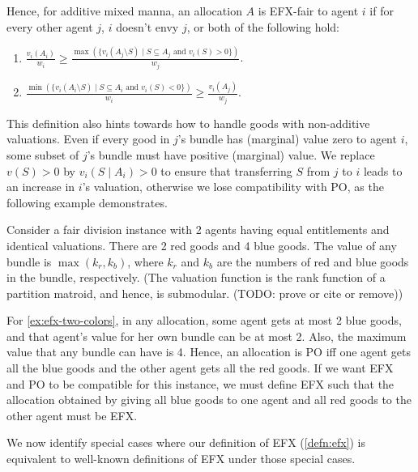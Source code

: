 Hence, for additive mixed manna, an allocation $A$ is EFX-fair to agent $i$
if for every other agent $j$, $i$ doesn't envy $j$, or both of the following hold:
\begin{enumerate}
\item $\displaystyle \frac{v_i(A_i)}{w_i} \ge \frac{\max(\{v_i(A_j \setminus S) \mid S \subseteq A_j
    \textrm{ and } v_i(S) > 0\})}{w_j}$.
\item $\displaystyle \frac{\min(\{v_i(A_i \setminus S) \mid S \subseteq A_i
    \textrm{ and } v_i(S) < 0 \})}{w_i} \ge \frac{v_i(A_j)}{w_j}$.
\end{enumerate}

This definition also hints towards how to handle goods with non-additive valuations.
Even if every good in $j$'s bundle has (marginal) value zero to agent $i$,
some subset of $j$'s bundle must have positive (marginal) value.
We replace $v(S) > 0$ by $v_i(S \mid A_i) > 0$ to ensure that
transferring $S$ from $j$ to $i$ leads to an increase in $i$'s valuation,
otherwise we lose compatibility with PO, as the following example demonstrates.

\begin{example}
\label{ex:efx-two-colors}
Consider a fair division instance with 2 agents having equal entitlements and identical valuations.
There are 2 red goods and 4 blue goods. The value of any bundle is $\max(k_r, k_b)$,
where $k_r$ and $k_b$ are the numbers of red and blue goods in the bundle, respectively.
(The valuation function is the rank function of a partition matroid,
and hence, is submodular. (TODO: prove or cite or remove))
\end{example}

For \cref{ex:efx-two-colors}, in any allocation, some agent gets at most 2 blue goods,
and that agent's value for her own bundle can be at most 2.
Also, the maximum value that any bundle can have is 4.
Hence, an allocation is PO iff one agent gets all the blue goods
and the other agent gets all the red goods.
If we want EFX and PO to be compatible for this instance,
we must define EFX such that the allocation obtained by giving
all blue goods to one agent and all red goods to the other agent must be EFX.

We now identify special cases where our definition of EFX (\cref{defn:efx})
is equivalent to well-known definitions of EFX under those special cases.

